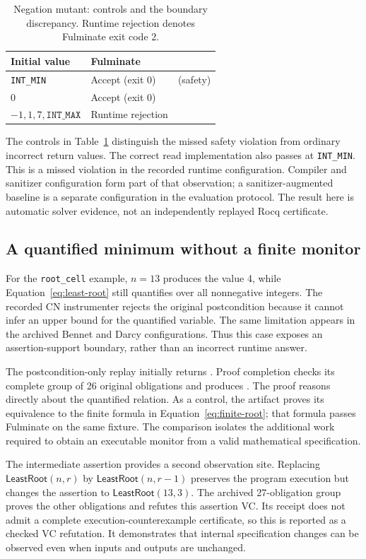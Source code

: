 \begin{table}[t]
\centering\small
\caption{Negation mutant: controls and the boundary discrepancy. Runtime rejection denotes Fulminate exit code 2.}
\label{tab:read-min}
\begin{tabular}{@{}lll@{}}
\toprule
Initial value & Fulminate & \tespec{}\\
\midrule
\texttt{INT\_MIN} & Accept (exit 0) & \fail{} (safety)\\
$0$ & Accept (exit 0) & \pass{}\\
$-1,1,7,\texttt{INT\_MAX}$ & Runtime rejection & \fail{}\\
\bottomrule
\end{tabular}
\end{table}
The controls in Table~\ref{tab:read-min} distinguish the missed safety
violation from ordinary incorrect return values. The correct read
implementation also passes at \texttt{INT\_MIN}. This is a missed violation
in the recorded runtime configuration. Compiler and sanitizer configuration
form part of that observation; a sanitizer-augmented baseline is a separate
configuration in the evaluation protocol. The \tespec{} result here is
automatic solver evidence, not an independently replayed Rocq certificate.

\subsection{A quantified minimum without a finite monitor}
For the \texttt{root\_cell} example, $n=13$ produces the value 4, while
Equation~\eqref{eq:least-root} still quantifies over all nonnegative integers.
The recorded CN instrumenter rejects the original postcondition because it
cannot infer an upper bound for the quantified variable. The same limitation
appears in the archived Bennet and Darcy configurations. Thus this case
exposes an assertion-support boundary, rather than an incorrect runtime
answer.

The \tespec{} postcondition-only replay initially returns \unknown{}.
Proof completion checks its complete group of 26 original obligations and
produces \pass{}. The proof reasons directly about the quantified relation.
As a control, the artifact proves its equivalence to the finite formula in
Equation~\eqref{eq:finite-root}; that formula passes Fulminate on the same
fixture. The comparison isolates the additional work required to obtain an
executable monitor from a valid mathematical specification.

The intermediate assertion provides a second observation site. Replacing
$\mathsf{LeastRoot}(n,r)$ by $\mathsf{LeastRoot}(n,r-1)$ preserves the program
execution but changes the assertion to $\mathsf{LeastRoot}(13,3)$. The archived
27-obligation group proves the other obligations and refutes this assertion
VC. Its receipt does not admit a complete execution-counterexample
certificate, so this is reported as a checked VC refutation. It demonstrates
that internal specification changes can be observed even when inputs and
outputs are unchanged.

